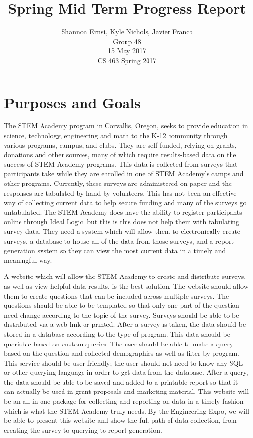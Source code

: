 \documentclass[letterpaper,10pt,serif,draftclsnofoot,onecolumn,compsoc,titlepage]{IEEEtran}
\title{Spring Mid Term Progress Report}
\author{Shannon Ernst, Kyle Nichols, Javier Franco\\ Group 48 \\ 15 May 2017 \\ CS 463 Spring 2017}
\begin{document}
\maketitle
\begin{abstract}

\end{abstract}
\newpage
\tableofcontents
\newpage
\section{Purposes and Goals}
The STEM Academy program in Corvallis, Oregon, seeks to provide education in science, technology, engineering and math to the K-12 community through various programs, campus, and clubs.
They are self funded, relying on grants, donations and other sources, many of which require results-based data on the success of STEM Academy programs.
This data is collected from surveys that participants take while they are enrolled in one of STEM Academy's camps and other programs.
Currently, these surveys are administered on paper and the responses are tabulated by hand by volunteers.
This has not been an effective way of collecting current data to help secure funding and many of the surveys go untabulated.
The STEM Academy does have the ability to register participants online through Ideal Logic, but this is this does not help them with tabulating survey data.
They need a system which will allow them to electronically create surveys, a database to house all of the data from those surveys, and a report generation system so they can view the most current data in a timely and meaningful way.

A website which will allow the STEM Academy to create and distribute surveys, as well as view helpful data results, is the best solution.
The website should allow them to create questions that can be included across multiple surveys.
The questions should be able to be templated so that only one part of the question need change according to the topic of the survey.
Surveys should be able to be distributed via a web link or printed.
After a survey is taken, the data should be stored in a database according to the type of program.
This data should be queriable based on custom queries.
The user should be able to make a query based on the question and collected demographics as well as filter by program.
This service should be user friendly; the user should not need to know any SQL or other querying language in order to get data from the database.
After a query, the data should be able to be saved and added to a printable report so that it can actually be used in grant proposals and marketing material.
This website will be an all in one package for collecting and reporting on data in a timely fashion which is what the STEM Academy truly needs.
By the Engineering Expo, we will be able to present this website and show the full path of data collection, from creating the survey to querying to report generation.
\end{document}
